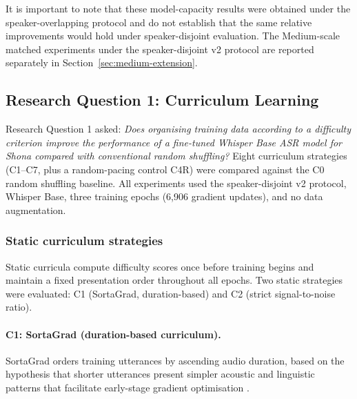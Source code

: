 It is important to note that these model-capacity results were obtained under
the speaker-overlapping protocol and do not establish that the same relative
improvements would hold under speaker-disjoint evaluation. The Medium-scale
matched experiments under the speaker-disjoint v2 protocol are reported
separately in Section~\ref{sec:medium-extension}.


\subsection{Research Question 1: Curriculum Learning}
\label{sec:rq1-results}

Research Question 1 asked: \textit{Does organising training data according to a
difficulty criterion improve the performance of a fine-tuned Whisper Base ASR
model for Shona compared with conventional random shuffling?} Eight curriculum
strategies (C1--C7, plus a random-pacing control C4R) were compared against the
C0 random shuffling baseline. All experiments used the speaker-disjoint v2
protocol, Whisper Base, three training epochs (6{,}906 gradient updates), and no
data augmentation.

\subsubsection{Static curriculum strategies}

Static curricula compute difficulty scores once before training begins and
maintain a fixed presentation order throughout all epochs. Two static strategies
were evaluated: C1 (SortaGrad, duration-based) and C2 (strict
signal-to-noise ratio).

\paragraph{C1: SortaGrad (duration-based curriculum).}

SortaGrad orders training utterances by ascending audio duration, based on the
hypothesis that shorter utterances present simpler acoustic and linguistic
patterns that facilitate early-stage gradient optimisation \citep{Amodei2016}.

